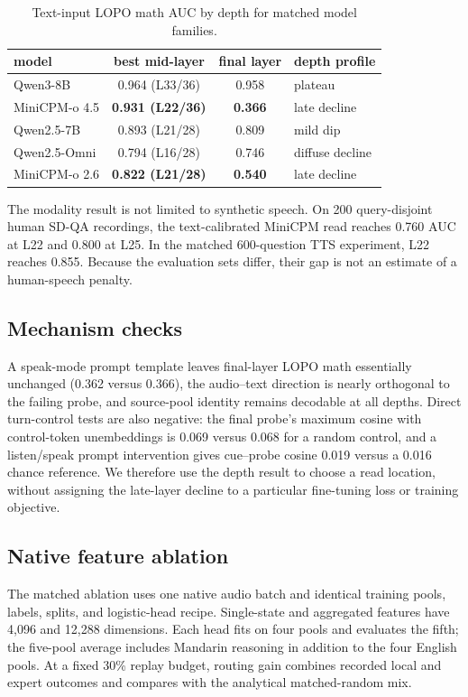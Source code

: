 \begin{table}[h]
\centering\small
\caption{Text-input LOPO math AUC by depth for matched model families.}
\label{tab:lopo}
\begin{tabular}{lccl}
\toprule
model & best mid-layer & final layer & depth profile \\
\midrule
Qwen3-8B & 0.964 (L33/36) & 0.958 & plateau \\
MiniCPM-o 4.5 & \textbf{0.931 (L22/36)} & \textbf{0.366} & late decline \\
Qwen2.5-7B & 0.893 (L21/28) & 0.809 & mild dip \\
Qwen2.5-Omni & 0.794 (L16/28) & 0.746 & diffuse decline \\
MiniCPM-o 2.6 & \textbf{0.822 (L21/28)} & \textbf{0.540} & late decline \\
\bottomrule
\end{tabular}
\end{table}

The modality result is not limited to synthetic speech. On 200 query-disjoint
human SD-QA recordings, the text-calibrated MiniCPM read reaches 0.760 AUC at
L22 and 0.800 at L25. In the matched 600-question TTS experiment, L22 reaches
0.855. Because the evaluation sets differ, their gap is not an estimate of a
human-speech penalty.

\subsection{Mechanism checks}
\label{app:mech}
A speak-mode prompt template leaves final-layer LOPO math essentially unchanged
(0.362 versus 0.366), the audio--text direction is nearly orthogonal to the
failing probe, and source-pool identity remains decodable at all depths. Direct
turn-control tests are also negative: the final probe's maximum cosine with
control-token unembeddings is 0.069 versus 0.068 for a random control, and a
listen/speak prompt intervention gives cue--probe cosine 0.019 versus a 0.016
chance reference. We therefore use the depth result to choose a read location,
without assigning the late-layer decline to a particular fine-tuning loss or
training objective.

\subsection{Native feature ablation}
\label{app:native-ablation}
The matched ablation uses one native audio batch and identical training pools,
labels, splits, and logistic-head recipe. Single-state and aggregated features
have 4,096 and 12,288 dimensions. Each head fits on four pools and evaluates the
fifth; the five-pool average includes Mandarin reasoning in addition to the four
English pools. At a fixed 30\% replay budget, routing gain combines recorded
local and expert outcomes and compares with the analytical matched-random mix.

